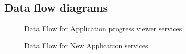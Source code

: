 \documentclass[12pt]{article}
\begin{document}
\newpage
\subsection{Data flow diagrams}
\begin{figure}[H]
\centering	
{}
\caption{Data Flow for Application progress viewer services}
\end{figure}

\begin{figure}[H]
\centering	
{}
\caption{Data Flow for New Application services}
\end{figure}
\end{document}
